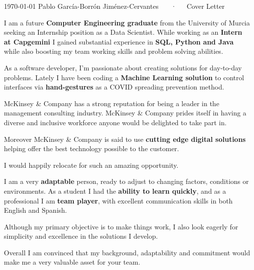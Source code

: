 \documentclass[11pt, a4paper]{awesome-cv}
\begin{document}
\makecvheader[R]

\makecvfooter
  {\today}
  {Pablo García-Borrón Jiménez-Cervantes ~~~·~~~Cover Letter}
  {}

\makelettertitle

\begin{cvletter}


I am a future\textbf{ Computer Engineering graduate }from the University of Murcia seeking an Internship position as a Data Scientist.
While working as an\textbf{ Intern at Capgemini }I gained substantial experience in \textbf{SQL, Python and Java} while also boosting my team working skills and problem solving abilities.

As a software developer, I’m passionate about creating solutions for day-to-day problems. Lately I have been coding a\textbf{ Machine Learning solution }to control interfaces via\textbf{ hand-gestures} as a COVID spreading prevention method.



 McKinsey \& Company has a strong reputation for being a leader in the  management consulting industry. McKinsey \& Company prides itself in having a diverse and inclusive workforce anyone would be delighted to take part in.
 
 Moreover McKinsey \& Company is said to use \textbf{cutting edge digital solutions} helping offer the best technology possible to the customer.
 
 I would happily relocate for such an amazing opportunity.

 

I am a very \textbf{adaptable} person, ready to adjust to changing factors, conditions or environments. As a student I had the \textbf{ability to learn quickly}, and as a professional I am\textbf{ team player}, with excellent communication skills in both English and Spanish. 

Although my primary objective is to make things work, I also look eagerly for simplicity and excellence in the solutions I develop.

Overall I am convinced that my background, adaptability and commitment would make me a very valuable asset for your team.





\end{cvletter}


\makeletterclosing
\end{document}
